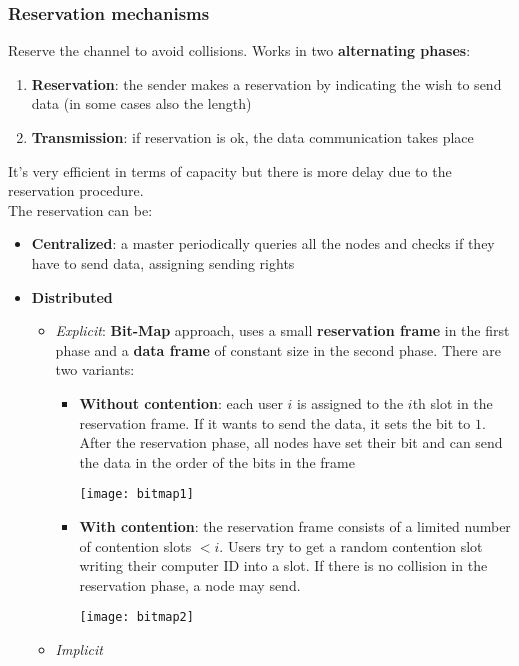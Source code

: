 \subsubsection{Reservation mechanisms}
Reserve the channel to avoid collisions. Works in two \textbf{alternating phases}:
\begin{enumerate}
	\item \textbf{Reservation}: the sender makes a reservation by indicating the wish to send data (in some cases also the length)
	\item \textbf{Transmission}: if reservation is ok, the data communication takes place 
\end{enumerate}
It's very efficient in terms of capacity but there is more delay due to the reservation procedure.\\
The reservation can be:
\begin{itemize}
	\item \textbf{Centralized}: a master periodically queries all the nodes and checks if they have to send data, assigning sending rights
	\item \textbf{Distributed}
	\begin{itemize}
		\item \textit{Explicit}: \textbf{Bit-Map} approach, uses a small \textbf{reservation frame} in the first phase and a \textbf{data frame} of constant size in the second phase. There are two variants:
		\begin{itemize}
			\item \textbf{Without contention}: each user $i$ is assigned to the $i$th slot in the reservation frame. If it wants to send the data, it sets the bit to $1$. After the reservation phase, all nodes have set their bit and can send the data in the order of the bits in the frame
			\begin{center}
				\texttt{[image: bitmap1]}
			\end{center}
			\item \textbf{With contention}: the reservation frame consists of a limited number of contention slots  $<i$. Users try to get a random contention slot writing their computer ID into a slot. If there is no collision in the reservation phase, a node may send.
			\begin{center}
				\texttt{[image: bitmap2]}
			\end{center}
		\end{itemize}
		\item \textit{Implicit}
		\begin{itemize}

\end{itemize}
\end{itemize}
\end{itemize}
